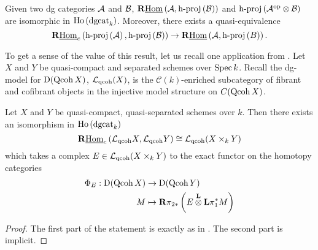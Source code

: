 \begin{corollary} \label{corollary: Toen}
  Given two dg categories \(\mathcal{A}\) and \(\mathcal{B}\), \(\mathbf{R}\underline{\operatorname{Hom}}\left(\mathcal{A}, \operatorname{h-proj}\left(\mathcal{B}\right)\right)\) and \(\operatorname{h-proj}\left(\mathcal{A}^{\operatorname{op}} \otimes \mathcal{B}\right)\) are isomorphic in \(\operatorname{Ho}\left(\operatorname{dgcat}_k\right)\).
  Moreover, there exists a quasi-equivalence
  \[\mathbf{R}\underline{\operatorname{Hom}}_c\left(\operatorname{h-proj}\left(\mathcal{A}\right),\operatorname{h-proj}\left(\mathcal{B}\right)\right) \to \mathbf{R}\underline{\operatorname{Hom}}\left(\mathcal{A}, \operatorname{h-proj}\left(B\right)\right).\]
\end{corollary}

To get a sense of the value of this result, let us recall one application from \textcite[Section 8.3]{Toen07}. Let \(X\) and \(Y\) be quasi-compact and separated schemes over \(\operatorname{Spec} k\). 
Recall the dg-model for \(\mathrm{D}(\operatorname{Qcoh} X)\), \(\mathcal L_{\operatorname{qcoh}}(X)\), is the \(\mathcal C(k)\)-enriched subcategory of fibrant and cofibrant objects in the injective model structure on \(C(\operatorname{Qcoh} X)\).

\begin{theorem}
  Let \(X\) and \(Y\) be quasi-compact, quasi-separated schemes over \(k\). Then there exists an isomorphism in \(\operatorname{Ho}\left(\operatorname{dgcat}_k\right)\)
  \begin{displaymath}
    \mathbf{R}\underline{\operatorname{Hom}}_c\left(\mathcal L_{\operatorname{qcoh}} X,\mathcal L_{\operatorname{qcoh}} Y\right) \cong \mathcal L_{\operatorname{qcoh}} (X \times_k Y)
  \end{displaymath}
  which takes a complex \(E \in \mathcal L_{\operatorname{qcoh}} (X \times_k Y)\) to the exact functor on the homotopy categories
  \begin{align*}
    \Phi_E : \mathrm{D}(\operatorname{Qcoh}X) & \to \mathrm{D}(\operatorname{Qcoh}Y) \\
    M & \mapsto \mathbf{R}\pi_{2 \ast} \left( E \overset{\mathbf{L}}{\otimes} \mathbf{L}\pi_1^\ast M \right)
  \end{align*}
\end{theorem}

\begin{proof}
  The first part of the statement is exactly as in \textcite{Toen07}. The second part is implicit. 
\end{proof}
